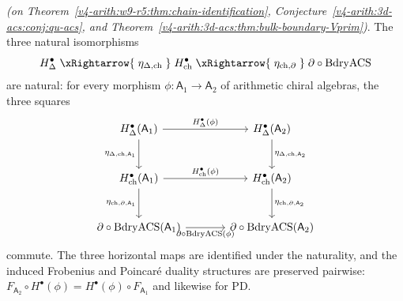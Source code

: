 \begin{theorem}
\label{v4-arith:w9-r5:thm:naturality-A}
\ClaimStatusProvedHereConditional \emph{(on
Theorem~\ref{v4-arith:w9-r5:thm:chain-identification},
Conjecture~\ref{v4-arith:3d-acs:conj:qu-acs}, and
Theorem~\ref{v4-arith:3d-acs:thm:bulk-boundary-Vprim})}. The three natural
isomorphisms
\begin{equation}
\label{v4-arith:w9-r5:eq:natural-iso}
H^{\bullet}_{\Delta}\;\xRightarrow{\;\eta_{\Delta,\mathrm{ch}}\;}\;H^{\bullet}_{\mathrm{ch}}
\;\xRightarrow{\;\eta_{\mathrm{ch},\partial}\;}\;\partial\circ\mathrm{BdryACS}
\end{equation}
are natural: for every morphism \(\phi\colon\mathsf{A}_{1}\to\mathsf{A}_{2}\)
of arithmetic chiral algebras, the three squares
\[
\begin{tikzcd}[column sep=large,row sep=large]
H^{\bullet}_{\Delta}(\mathsf{A}_{1})\arrow[r,"H^{\bullet}_{\Delta}(\phi)"]\arrow[d,"\eta_{\Delta,\mathrm{ch},\mathsf{A}_{1}}"']
& H^{\bullet}_{\Delta}(\mathsf{A}_{2})\arrow[d,"\eta_{\Delta,\mathrm{ch},\mathsf{A}_{2}}"]\\
H^{\bullet}_{\mathrm{ch}}(\mathsf{A}_{1})\arrow[r,"H^{\bullet}_{\mathrm{ch}}(\phi)"]\arrow[d,"\eta_{\mathrm{ch},\partial,\mathsf{A}_{1}}"']
& H^{\bullet}_{\mathrm{ch}}(\mathsf{A}_{2})\arrow[d,"\eta_{\mathrm{ch},\partial,\mathsf{A}_{2}}"]\\
\partial\circ\mathrm{BdryACS}(\mathsf{A}_{1})\arrow[r,"\partial\circ\mathrm{BdryACS}(\phi)"']
& \partial\circ\mathrm{BdryACS}(\mathsf{A}_{2})
\end{tikzcd}
\]
commute. The three horizontal maps are identified under the
naturality, and the induced Frobenius and Poincar\'e duality
structures are preserved pairwise: \(F_{\mathsf{A}_{2}}\circ H^{\bullet}(\phi)=H^{\bullet}(\phi)\circ F_{\mathsf{A}_{1}}\)
and likewise for \(\mathrm{PD}\).
\end{theorem}

